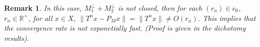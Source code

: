 \documentclass[11pt, a4paper]{amsart}
\newtheorem{remark}[theorem]{Remark}
\begin{document}
\begin{remark}
In this case, $M_{1}^{\perp}+M_{2}^{\perp}$ is not closed, then for each $(r_n)\in c_0$, $r_n\in\mathbb{R}^{+}$, for all $x\in X$, $\|T^n x-P_{M}x\|=\|T^n x\| \neq O(r_n)$. This implies that the convergence rate is not exponetially fast. 
(Proof is given in the \emph{dichotomy results}).
\end{remark}
\end{document}
